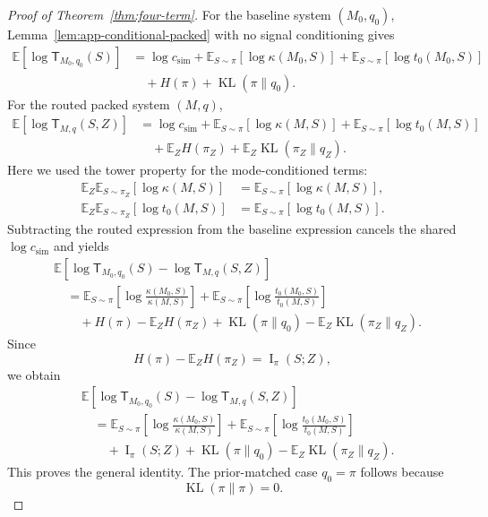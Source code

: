 \documentclass{article}
\DeclareMathOperator{\KL}{KL}
\DeclareMathOperator{\MI}{I}
\newcommand{\E}{\mathbb{E}}
\begin{document}
\begin{proof}[Proof of Theorem~\ref{thm:four-term}]
For the baseline system \((M_0,q_0)\), Lemma~\ref{lem:app-conditional-packed} with no
signal conditioning gives
\[
\begin{aligned}
    \E[\log \mathsf T_{M_0,q_0}(S)]
    &=
    \log c_{\mathrm{sim}}
    +
    \E_{S\sim\pi}[\log\kappa(M_0,S)]
    +
    \E_{S\sim\pi}[\log t_0(M_0,S)]
    \\
    &\quad
    +
    H(\pi)
    +
    \KL(\pi\|q_0).
\end{aligned}
\]
For the routed packed system \((M,q)\),
\[
\begin{aligned}
    \E[\log \mathsf T_{M,q}(S,Z)]
    &=
    \log c_{\mathrm{sim}}
    +
    \E_{S\sim\pi}[\log\kappa(M,S)]
    +
    \E_{S\sim\pi}[\log t_0(M,S)]
    \\
    &\quad
    +
    \E_ZH(\pi_Z)
    +
    \E_Z\KL(\pi_Z\|q_Z).
\end{aligned}
\]
Here we used the tower property for the mode-conditioned terms:
\[
\begin{aligned}
    \E_Z\E_{S\sim\pi_Z}[\log\kappa(M,S)]
    &=\E_{S\sim\pi}[\log\kappa(M,S)],\\
    \E_Z\E_{S\sim\pi_Z}[\log t_0(M,S)]
    &=\E_{S\sim\pi}[\log t_0(M,S)].
\end{aligned}
\]
Subtracting the routed expression from the baseline expression cancels the shared
\(\log c_{\mathrm{sim}}\) and yields
\[
\begin{aligned}
&\E[
    \log \mathsf T_{M_0,q_0}(S)
    -
    \log \mathsf T_{M,q}(S,Z)
]
\\
&\quad =
\E_{S\sim\pi}
\left[
    \log\frac{\kappa(M_0,S)}{\kappa(M,S)}
\right]
+
\E_{S\sim\pi}
\left[
    \log\frac{t_0(M_0,S)}{t_0(M,S)}
\right]
\\
&\qquad
+
H(\pi)-\E_ZH(\pi_Z)
+
\KL(\pi\|q_0)
-
\E_Z\KL(\pi_Z\|q_Z).
\end{aligned}
\]
Since
\[
    H(\pi)-\E_ZH(\pi_Z)=\MI_\pi(S;Z),
\]
we obtain
\[
\begin{aligned}
&\E[
    \log \mathsf T_{M_0,q_0}(S)
    -
    \log \mathsf T_{M,q}(S,Z)
]
\\
&\quad =
\E_{S\sim\pi}
\left[
    \log\frac{\kappa(M_0,S)}{\kappa(M,S)}
\right]
+
\E_{S\sim\pi}
\left[
    \log\frac{t_0(M_0,S)}{t_0(M,S)}
\right]
\\
&\qquad
+
\MI_\pi(S;Z)
+
\KL(\pi\|q_0)
-
\E_Z\KL(\pi_Z\|q_Z).
\end{aligned}
\]
This proves the general identity.  The prior-matched case \(q_0=\pi\) follows because
\[
    \KL(\pi\|\pi)=0.
\]
\end{proof}
\end{document}
